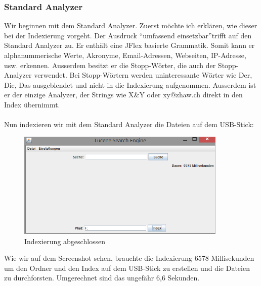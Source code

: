 \documentclass[12pt,a4paper,ngerman]{report}
\begin{document}
\subsubsection{Standard Analyzer}
Wir beginnen mit dem Standard Analyzer. Zuerst möchte ich erklären, wie dieser bei der Indexierung vorgeht. Der Ausdruck \textquotedblleft umfassend einsetzbar\textquotedblright trifft auf den Standard Analyzer zu. Er enthält eine JFlex basierte Grammatik. Somit kann er alphanummerische Werte, Akronyme, Email-Adressen, Webseiten, IP-Adresse, usw. erkennen. Ausserdem besitzt er die Stopp-Wörter, die auch der Stopp-Analyzer verwendet. Bei Stopp-Wörtern werden uninteressante Wörter wie Der, Die, Das ausgeblendet und nicht in die Indexierung aufgenommen. Ausserdem ist er der einzige Analyzer, der Strings wie X\&Y oder xy@zhaw.ch direkt in den Index übernimmt.\\
\\
Nun indexieren wir mit dem Standard Analyzer die Dateien auf dem USB-Stick:
\begin{figure}[h!]
\centering
\includegraphics[width=10cm]{img/standard-analyzer-index.png}
\caption{Indexierung abgeschlossen\protect\footnotemark}
\end{figure}
Wie wir auf dem Screenshot sehen, brauchte die Indexierung 6578 Millisekunden um den Ordner und den Index auf dem USB-Stick zu erstellen und die Dateien zu durchforsten. Umgerechnet sind das ungefähr 6,6 Sekunden.
\end{document}

